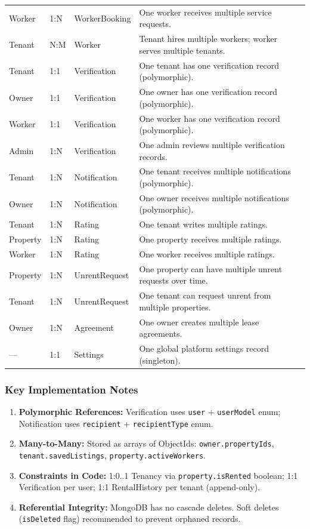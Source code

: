 \documentclass[12pt,a4paper]{article}
\begin{document}
\begin{longtable}{@{}p{3.5cm}p{1.8cm}p{3.8cm}p{6cm}@{}}
Worker & 1:N & WorkerBooking & One worker receives multiple service requests. \\[3pt]
Tenant & N:M & Worker & Tenant hires multiple workers; worker serves multiple tenants. \\[3pt]
Tenant & 1:1 & Verification & One tenant has one verification record (polymorphic). \\[3pt]
Owner & 1:1 & Verification & One owner has one verification record (polymorphic). \\[3pt]
Worker & 1:1 & Verification & One worker has one verification record (polymorphic). \\[3pt]
Admin & 1:N & Verification & One admin reviews multiple verification records. \\[3pt]
Tenant & 1:N & Notification & One tenant receives multiple notifications (polymorphic). \\[3pt]
Owner & 1:N & Notification & One owner receives multiple notifications (polymorphic). \\[3pt]
Tenant & 1:N & Rating & One tenant writes multiple ratings. \\[3pt]
Property & 1:N & Rating & One property receives multiple ratings. \\[3pt]
Worker & 1:N & Rating & One worker receives multiple ratings. \\[3pt]
Property & 1:N & UnrentRequest & One property can have multiple unrent requests over time. \\[3pt]
Tenant & 1:N & UnrentRequest & One tenant can request unrent from multiple properties. \\[3pt]
Owner & 1:N & Agreement & One owner creates multiple lease agreements. \\[3pt]
--- & 1:1 & Settings & One global platform settings record (singleton). \\[3pt]
\end{longtable}

\subsubsection*{Key Implementation Notes}

\begin{enumerate}
  \item \textbf{Polymorphic References:} Verification uses \texttt{user} + \texttt{userModel} enum; Notification uses \texttt{recipient} + \texttt{recipientType} enum.
  \item \textbf{Many-to-Many:} Stored as arrays of ObjectIds: \texttt{owner.propertyIds}, \texttt{tenant.savedListings}, \texttt{property.activeWorkers}.
  \item \textbf{Constraints in Code:} 1:0..1 Tenancy via \texttt{property.isRented} boolean; 1:1 Verification per user; 1:1 RentalHistory per tenant (append-only).
  \item \textbf{Referential Integrity:} MongoDB has no cascade deletes. Soft deletes (\texttt{isDeleted} flag) recommended to prevent orphaned records.
\end{enumerate}
\end{document}
